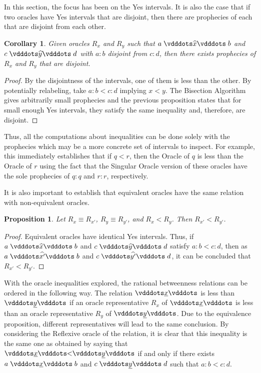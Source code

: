\documentclass[12pt]{article}
\newtheorem{corollary}{Corollary}[section]
\newtheorem{proposition}{Proposition}[section]
\begin{document}
In this section, the focus has been on the Yes intervals. It is also the case that if two oracles have Yes intervals that are disjoint, then there are prophecies of each that are disjoint from each other.

\begin{corollary}
    Given oracles $R_x$ and $R_y$ such that $a \xora b$ and $c \xora[y] d$ with $a:b$ disjoint from $c:d$, then there exists prophecies of $R_x$ and $R_y$ that are disjoint. 
\end{corollary}

\begin{proof}
    By the disjointness of the intervals, one of them is less than the other. By potentially relabeling, take $a:b < c:d$ implying $x < y$. The Bisection Algorithm gives arbitrarily small prophecies and the previous proposition states that for small enough Yes intervals, they satisfy the same inequality and, therefore, are disjoint. 
\end{proof}

Thus, all the computations about inequalities can be done solely with the prophecies which may be a more concrete set of intervals to inspect. For example, this immediately establishes that if $q < r$, then the Oracle of $q$ is less than the Oracle of $r$ using the fact that the Singular Oracle version of these oracles have the sole prophecies of $q:q$ and $r:r$, respectively. 

It is also important to establish that equivalent oracles have the same relation with non-equivalent oracles. 

\begin{proposition}
    Let $R_x \equiv R_{x'}$, $R_y \equiv R_{y'}$, and $R_x < R_y$. Then $R_{x'} < R_{y'}$.
\end{proposition}

\begin{proof}
    Equivalent oracles have identical Yes intervals. Thus, if $a \xora b$ and $c \xora[y] d$ satisfy $a:b < c:d$, then as $a \xora[x'] b$ and $c \xora[y'] d$, it can be concluded that $R_{x'} < R_{y'}$.
\end{proof}

With the oracle inequalities explored, the rational betweenness relations can be ordered in the following way. The relation $\xrel$ is less than $\xrel[y]$ if an oracle representative $R_x$ of $\xrel$ is less than an oracle representative $R_y$ of $\xrel[y]$. Due to the equivalence proposition, different representatives will lead to the same conclusion. By considering the Reflexive oracle of the relation, it is clear that this inequality is the same one as obtained by saying that $\xrel < \xrel[y]$ if and only if there exists $a \xrel b$ and $c \xrel[y] d$ such that $a:b < c:d$. 
\end{document}
